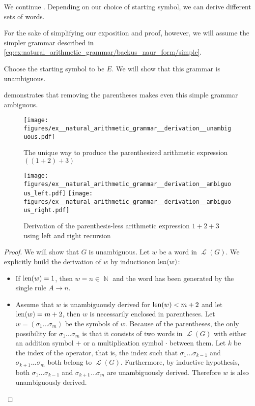 \begin{example}\label{ex:natural_arithmetic_grammar/derivation}
  We continue . Depending on our choice of starting symbol, we can derive different sets of words.

  For the sake of simplifying our exposition and proof, however, we will assume the simpler grammar described in \eqref{eq:ex:natural_arithmetic_grammar/backus_naur_form/simple}.

  Choose the starting symbol to be \( E \). We will show that this grammar is unambiguous.

   demonstrates that removing the parentheses makes even this simple grammar ambiguous.

  \begin{figure}
    \centering
    \texttt{[image: figures/ex\_\_natural\_arithmetic\_grammar\_\_derivation\_\_unambiguous.pdf]}
    \caption{The unique way to produce the parenthesized arithmetic expression \( ((1 + 2) + 3) \)}
    \label{fig:ex:natural_arithmetic_grammar/derivation/unambiguous}
  \end{figure}

  \begin{figure}
    \texttt{[image: figures/ex\_\_natural\_arithmetic\_grammar\_\_derivation\_\_ambiguous\_left.pdf]}
    \hfill
    \texttt{[image: figures/ex\_\_natural\_arithmetic\_grammar\_\_derivation\_\_ambiguous\_right.pdf]}
    \caption{Derivation of the parenthesis-less arithmetic expression \( 1 + 2 + 3 \) using left and right recursion}
    \label{fig:ex:natural_arithmetic_grammar/derivation/ambiguous}
  \end{figure}
\end{example}
\begin{proof}
  We will show that \( G \) is unambiguous. Let \( w \) be a word in \( \mscrL(G) \). We explicitly build the derivation of \( w \) by induction\IND on \( \operatorname{len}(w) \):
  \begin{itemize}
    \item If \( \operatorname{len}(w) = 1 \), then \( w = n \in \BbbN \) and the word has been generated by the single rule \( A \to n \).

    \item Assume that \( w \) is unambiguously derived for \( \operatorname{len}(w) < m + 2 \) and let \( \operatorname{len}(w) = m + 2 \), then \( w \) is necessarily enclosed in parentheses. Let \( w = ( \sigma_1 \ldots \sigma_m ) \) be the symbols of \( w \). Because of the parentheses, the only possibility for \( \sigma_1 \ldots \sigma_m \) is that it consists of two words in \( \mscrL(G) \) with either an addition symbol \( + \) or a multiplication symbol \( \cdot \) between them. Let \( k \) be the index of the operator, that is, the index such that \( \sigma_1 \ldots \sigma_{k-1} \) and \( \sigma_{k+1} \ldots \sigma_m \) both belong to \( \mscrL(G) \). Furthermore, by inductive hypothesis, both \( \sigma_1 \ldots \sigma_{k-1} \) and \( \sigma_{k+1} \ldots \sigma_m \) are unambiguously derived. Therefore \( w \) is also unambiguously derived.
  \end{itemize}
\end{proof}
